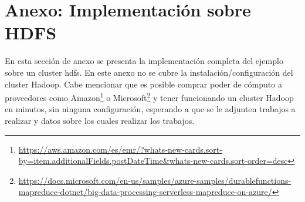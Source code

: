 \clearpage
\section*{Anexo: Implementación sobre HDFS}

En esta sección de anexo se presenta la implementación completa del ejemplo
sobre un cluster \acrshort{hdfs}. En este anexo no se cubre la
instalación/configuración del \gls{cluster} Hadoop. Cabe mencionar que es
posible comprar poder de cómputo a proveedores como Amazon\footnote{\url{https://aws.amazon.com/es/emr/?whats-new-cards.sort-by=item.additionalFields.postDateTime&whats-new-cards.sort-order=desc}} o
Microsoft\footnote{\url{https://docs.microsoft.com/en-us/samples/azure-samples/durablefunctions-mapreduce-dotnet/big-data-processing-serverless-mapreduce-on-azure/}}
y tener funcionando un cluster Hadoop en minutos, sin ninguna configuración,
esperando a que se le adjunten trabajos a realizar y datos sobre los cuales
realizar los trabajos.


